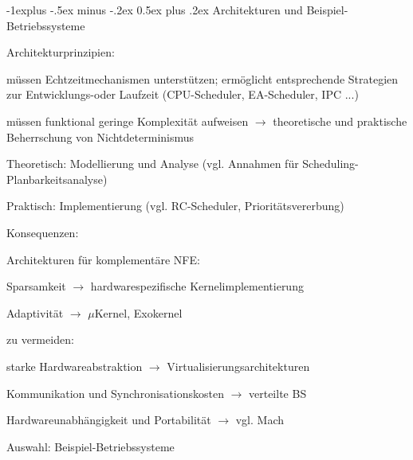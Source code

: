 \documentclass[a4paper]{article}
\makeatletter
\renewcommand{\subsection}{\@startsection{subsection}{2}{0mm}%
 {-1explus -.5ex minus -.2ex}%
 {0.5ex plus .2ex}%
 {\normalfont\normalsize\bfseries}}
\makeatother
\begin{document}
\begin{multicols}{3}
    \subsection{Architekturen und
        Beispiel-Betriebssysteme}

    \begin{itemize*}
        \item
        Architekturprinzipien:
        \begin{itemize*}
            \item müssen Echtzeitmechanismen unterstützen; ermöglicht entsprechende Strategien zur Entwicklungs-oder Laufzeit (CPU-Scheduler, EA-Scheduler, IPC ...)
            \item müssen funktional geringe Komplexität aufweisen $\rightarrow$ theoretische und praktische Beherrschung von Nichtdeterminismus \begin{itemize*} \item Theoretisch: Modellierung und Analyse (vgl. Annahmen für Scheduling-Planbarkeitsanalyse) \item Praktisch: Implementierung (vgl. RC-Scheduler, Prioritätsvererbung) \end{itemize*}
        \end{itemize*}
        \item
        Konsequenzen:
        \begin{itemize*}
            \item Architekturen für komplementäre NFE: \begin{itemize*} \item Sparsamkeit $\rightarrow$ hardwarespezifische Kernelimplementierung \item Adaptivität $\rightarrow$ $\mu$Kernel, Exokernel \end{itemize*}
            \item zu vermeiden: \begin{itemize*} \item starke Hardwareabstraktion $\rightarrow$ Virtualisierungsarchitekturen \item Kommunikation und Synchronisationskosten $\rightarrow$ verteilte BS \item Hardwareunabhängigkeit und Portabilität $\rightarrow$ vgl. Mach \end{itemize*}
        \end{itemize*}
    \end{itemize*}

    Auswahl: Beispiel-Betriebssysteme


\end{multicols}
\end{document}
